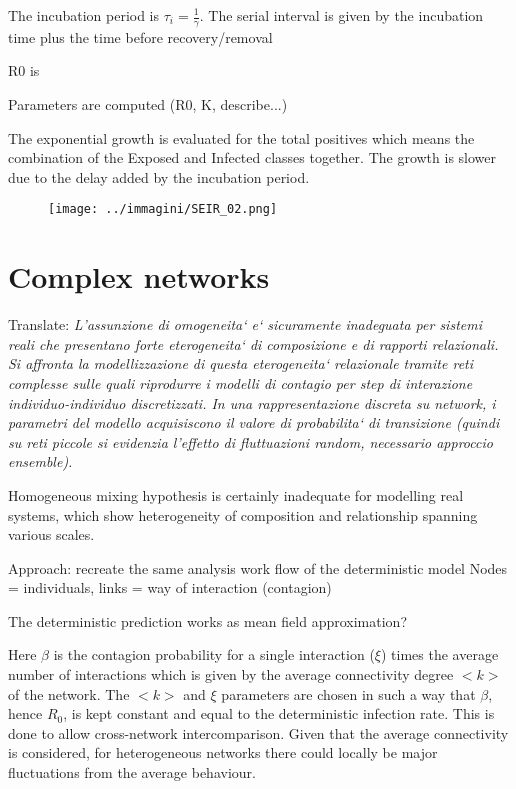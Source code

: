 \documentclass[DIV=12, BCOR=0pt]{scrartcl}  %
\begin{document}
 The incubation period is $\tau_{i}=\frac{1}{\gamma}$. The serial interval is given by the incubation time plus the time before recovery/removal 
 
 R0 is 
  

  
  Parameters are computed (R0, K, describe...)
  
  The exponential growth is evaluated for the total positives which means the combination of the Exposed and Infected classes together. The growth is slower due to the delay added by the incubation period.
  
  
  \begin{figure}[h]
  	\centering
  	\texttt{[image: ../immagini/SEIR\_02.png]}
  	\caption{}
  	\label{}
  \end{figure}
  
  \section{Complex networks}
  Translate: \textit{L'assunzione di omogeneita` e` sicuramente inadeguata per sistemi reali che presentano forte eterogeneita` di composizione e di rapporti relazionali. Si affronta la modellizzazione di questa eterogeneita` relazionale tramite reti complesse sulle quali riprodurre i modelli di contagio per step di interazione individuo-individuo discretizzati. In una rappresentazione discreta su network, i parametri del modello acquisiscono il valore di probabilita` di transizione (quindi su reti piccole si evidenzia l'effetto di fluttuazioni random, necessario approccio ensemble).  }
  
  Homogeneous mixing hypothesis is certainly inadequate for modelling real systems, which show heterogeneity of composition and relationship spanning various scales. 
  
  
  Approach: recreate the same analysis work flow of the deterministic model
  Nodes = individuals, links = way of interaction (contagion)
  
  The deterministic prediction works as mean field approximation?
  
  Here $\beta$ is the contagion probability for a single interaction ($\xi$) times the average number of interactions which is given by the average connectivity degree $<k>$ of the network. The $<k>$ and $\xi$ parameters are chosen in such a way that $\beta$, hence $R_{0}$, is kept constant and equal to the deterministic infection rate. This is done to allow cross-network intercomparison. Given that the average connectivity is considered, for heterogeneous networks there could locally be major fluctuations from the average behaviour.
  
\end{document}
